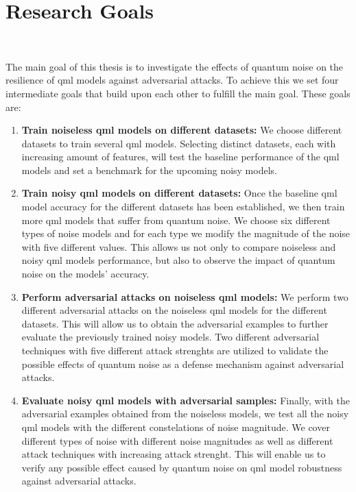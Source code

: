 \section{Research Goals} \

The main goal of this thesis is to investigate the effects of quantum noise
on the resilience of \ac{qml} models against adversarial
attacks. To achieve this we set four intermediate goals that build
upon each other to fulfill the main goal. These goals are: \

\begin{enumerate}
    \item \textbf{Train noiseless \ac{qml} models on different datasets:}
            We choose different datasets to train several \ac{qml} models.
            Selecting distinct datasets, each with increasing amount of
            features, will test the baseline performance of the \ac{qml}
            models and set a benchmark for the upcoming noisy models. \
    \item \textbf{Train noisy \ac{qml} models on different datasets:} Once
            the baseline \ac{qml} model accuracy for the different datasets
            has been established, we then train more \ac{qml} models that
            suffer from quantum noise. We choose six different types of
            noise models and for each type we modify the magnitude of the
            noise with five different values. This allows us not only
            to compare noiseless and noisy \ac{qml} models performance,
            but also to observe the impact of quantum noise on the models'
            accuracy. \
    \item \textbf{Perform adversarial attacks on noiseless \ac{qml} models:}
            We perform two different adversarial attacks on the noiseless
            \ac{qml} models for the different datasets. This will allow
            us to obtain the adversarial examples to further evaluate the
            previously trained noisy models. Two different adversarial
            techniques with five different attack strenghts are utilized
            to validate the possible effects of quantum noise as a defense
            mechanism against adversarial attacks. \
    \item \textbf{Evaluate noisy \ac{qml} models with adversarial samples:}
            Finally, with the adversarial examples obtained from the noiseless
            models, we test all the noisy \ac{qml} models with the different
            constelations of noise magnitude. We cover different types of noise
            with different noise magnitudes as well as different attack techniques
            with increasing attack strenght. This will enable us to verify
            any possible effect caused by quantum noise on \ac{qml} model robustness
            against adversarial attacks. \
  \end{enumerate} \


